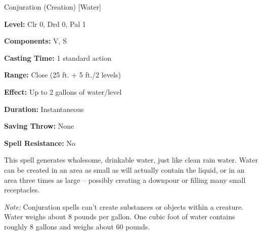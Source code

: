 
Conjuration (Creation) [Water]

\textbf{Level:} Clr 0, Drd 0, Pal 1

\textbf{Components:} V, S

\textbf{Casting Time:} 1 standard action

\textbf{Range:} Close (25 ft. + 5 ft./2 levels)

\textbf{Effect:} Up to 2 gallons of water/level

\textbf{Duration:} Instantaneous

\textbf{Saving Throw:} None

\textbf{Spell Resistance:} No

This spell generates wholesome, drinkable water, just like clean rain water. Water 
can be created in an area as small as will actually contain the liquid, or in an 
area three times as large -- possibly creating a downpour or filling many small 
receptacles.

\textit{Note:} Conjuration spells can't create substances or objects within a creature. 
Water weighs about 8 pounds per gallon. One cubic foot of water contains roughly 
8 gallons and weighs about 60 pounds.

